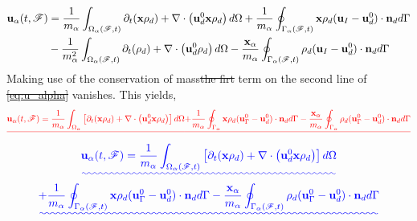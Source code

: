 \documentclass[11pt]{My_preprint}
\providecommand{\DIFadd}[1]{{\protect\color{blue}\uwave{#1}}} %
\providecommand{\DIFdel}[1]{{\protect\color{red}\sout{#1}}}                      %
\providecommand{\DIFaddbegin}{} %
\providecommand{\DIFaddend}{} %
\providecommand{\DIFdelbegin}{} %
\providecommand{\DIFdelend}{} %
\begin{document}
\begin{align}
    \textbf{u}_\alpha(t,\FF) &=  \frac{1}{m_\alpha}\DIFdelbegin %
\DIFdelend \DIFaddbegin \intOF{
        \pddt (\textbf{x}\rho_d ) + \div\left(\textbf{u}_d^0 \textbf{x} \rho_d\right) 
    } 
    \DIFaddend + \frac{1}{m_\alpha}\DIFdelbegin %
\DIFdelend \DIFaddbegin \intSF{ \textbf{x} \rho_d(\textbf{u}_I - \textbf{u}_d^0) \cdot \textbf{n}_d } \DIFaddend \nonumber\\
    & - \frac{1}{m_\alpha^2}\DIFdelbegin %
\DIFdelend \DIFaddbegin \intOF{
        \pddt (\rho_d ) + \div\left(\textbf{u}_d^0 \rho_d\right) 
    } \DIFaddend -  \frac{\textbf{x}_\alpha}{m_\alpha}    \DIFdelbegin %
\DIFdelend \DIFaddbegin \intSF{ \rho_d(\textbf{u}_I   - \textbf{u}_d^0) \cdot \textbf{n}_d }
    \label{eq:u_alpha2}
\DIFaddend \end{align}
Making use of the conservation of mass\DIFdelbegin \DIFdel{the firt }\DIFdelend \DIFaddbegin \DIFadd{, the first }\DIFaddend term on the second line of \DIFdelbegin \DIFdel{\ref{eq:u_alpha} }\DIFdelend \DIFaddbegin \DIFadd{\ref{eq:u_alpha2} }\DIFaddend vanishes. This yields,\DIFdelbegin \begin{displaymath}
    \DIFdel{\textbf{u}_\alpha(t,\FF) = 
    \frac{1}{m_\alpha}\intO{ \left[
        \pddt (\textbf{x}\rho_d ) + \div\left(\textbf{u}_d^0 \textbf{x} \rho_d\right) 
    \right]} }\\
    \DIFdel{+ \frac{1}{m_\alpha}\intS{ \textbf{x} \rho_d(\textbf{u}_\Gamma^0   - \textbf{u}_d^0) \cdot \textbf{n}_d }
    -  \frac{\textbf{x}_\alpha}{m_\alpha}    \intS{ \rho_d(\textbf{u}_\Gamma^0   - \textbf{u}_d^0) \cdot \textbf{n}_d }
}\end{displaymath}%
\DIFdelend \DIFaddbegin \begin{multline}
    \DIFadd{\textbf{u}_\alpha(t,\FF) = 
    \frac{1}{m_\alpha}\intOF{ \left[
        \pddt (\textbf{x}\rho_d ) + \div\left(\textbf{u}_d^0 \textbf{x} \rho_d\right) 
    \right]} }\\
    \DIFadd{+ \frac{1}{m_\alpha}\intSF{ \textbf{x} \rho_d(\textbf{u}_\Gamma^0   - \textbf{u}_d^0) \cdot \textbf{n}_d }
    -  \frac{\textbf{x}_\alpha}{m_\alpha}    \intSF{ \rho_d(\textbf{u}_\Gamma^0   - \textbf{u}_d^0) \cdot \textbf{n}_d }
}\end{multline}\DIFaddend 
\end{document}
